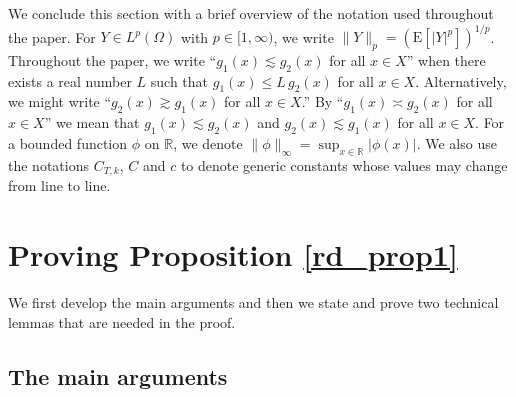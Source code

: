 \documentclass[12pt,a4paper]{article}
\newcommand{\R}{{\mathbb{R}}}
\newcommand{\E}{\mathrm{E}}
\newcommand{\<}{\langle}
\renewcommand{\>}{\rangle}
\begin{document}
 We conclude this section with a brief overview of the notation used throughout the paper.
For $Y\in L^p(\Omega)$ with $p\in[1,\infty)$, we write $\|Y\|_p=(\E[|Y|^p])^{1/p}$.  Throughout the paper, we write ``$g_1(x)\lesssim g_2(x)$ for all $x\in X$'' when
there exists a real number $L$ such that $g_1(x)\le L\, g_2(x)$ for all $x\in X$.
Alternatively, we might write ``$g_2(x)\gtrsim g_1(x)$ for all $x\in X$.'' By
``$g_1(x)\asymp g_2(x)$ for all $x\in X$'' we mean that $g_1(x)\lesssim g_2(x)$
 and $g_2(x)\lesssim g_1(x)$ for all $x\in X$. For a bounded function $\phi$ on $\R$, we denote $\|\phi\|_\infty=\sup_{x\in \R}|\phi(x)|$.
 We also use the notations $C_{T,k}$, $C$ and $c$ to denote generic constants whose values may change from line to line. 
 
 
 \section{Proving Proposition \ref{rd_prop1}}\label{rd08_04s1}

 We first develop the main arguments and then we state and prove two technical lemmas that are needed in the proof.
 
 \subsection{The main arguments}
 
\end{document}

